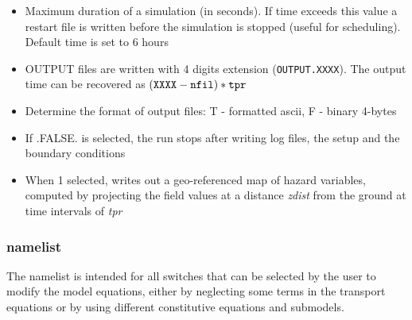 \begin{itemize}
\item
{}
{Maximum duration of a simulation (in seconds). If time exceeds this value
a restart file is written before the simulation is stopped (useful for
scheduling). Default time is set to 6 hours}

\item
{}
{OUTPUT files are written with 4 digits extension ({\tt OUTPUT.XXXX}). 
The output time can be recovered as $({\tt XXXX - nfil})* {\tt tpr}$ }

\item
{}
{Determine the format of output files: T - formatted ascii, 
F - binary 4-bytes }

\item
{}
{If .FALSE. is selected, the run stops after writing log files, the setup and the boundary conditions}

\item
{}
{ When 1 selected, writes out a geo-referenced map of hazard variables, computed by projecting the
field values at a distance {\em zdist} from the ground at time intervals of {\em tpr}}
\end{itemize}

\subsubsection{ namelist}
The  namelist is intended for all switches that can be selected
by the user to modify the model equations, either by neglecting some terms
in the transport equations or by using different constitutive equations
and submodels.

